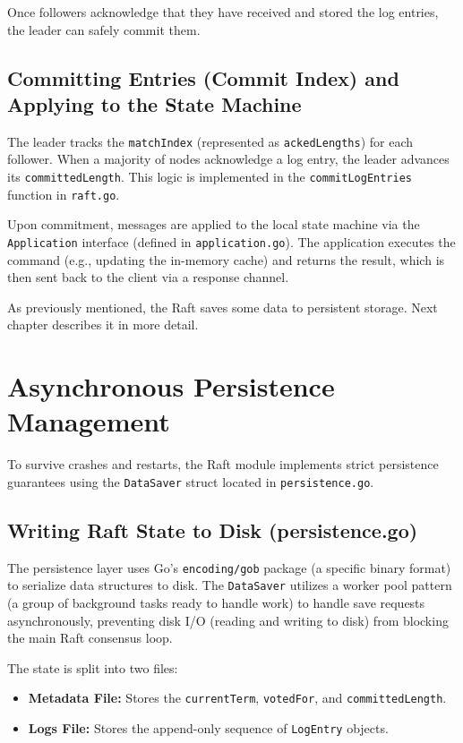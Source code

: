 \documentclass[shortabstract]{iithesis}
\begin{document}
Once followers acknowledge that they have received and stored the log entries, the leader can safely commit them.

\subsection{Committing Entries (Commit Index) and Applying to the State Machine}
\label{subsec:committing_entries}

The leader tracks the \texttt{matchIndex} (represented as \texttt{ackedLengths}) for each follower. When a majority of nodes acknowledge a log entry, the leader advances its \texttt{committedLength}. This logic is implemented in the \texttt{commitLogEntries} function in \texttt{raft.go}.

Upon commitment, messages are applied to the local state machine via the \texttt{Application} interface (defined in \texttt{application.go}). The application executes the command (e.g., updating the in-memory cache) and returns the result, which is then sent back to the client via a response channel.

As previously mentioned, the Raft saves some data to persistent storage. Next chapter describes it in more detail.

\section{Asynchronous Persistence Management}
\label{sec:persistence}

To survive crashes and restarts, the Raft module implements strict persistence guarantees using the \texttt{DataSaver} struct located in \texttt{persistence.go}.

\subsection{Writing Raft State to Disk (persistence.go)}
\label{subsec:writing_state}

The persistence layer uses Go's \texttt{encoding/gob} package (a specific binary format) to serialize data structures to disk. The \texttt{DataSaver} utilizes a worker pool pattern (a group of background tasks ready to handle work) to handle save requests asynchronously, preventing disk I/O (reading and writing to disk) from blocking the main Raft consensus loop. 

The state is split into two files:
\begin{itemize}
    \item \textbf{Metadata File:} Stores the \texttt{currentTerm}, \texttt{votedFor}, and \texttt{committedLength}.
    \item \textbf{Logs File:} Stores the append-only sequence of \texttt{LogEntry} objects.
\end{itemize}
\end{document}
